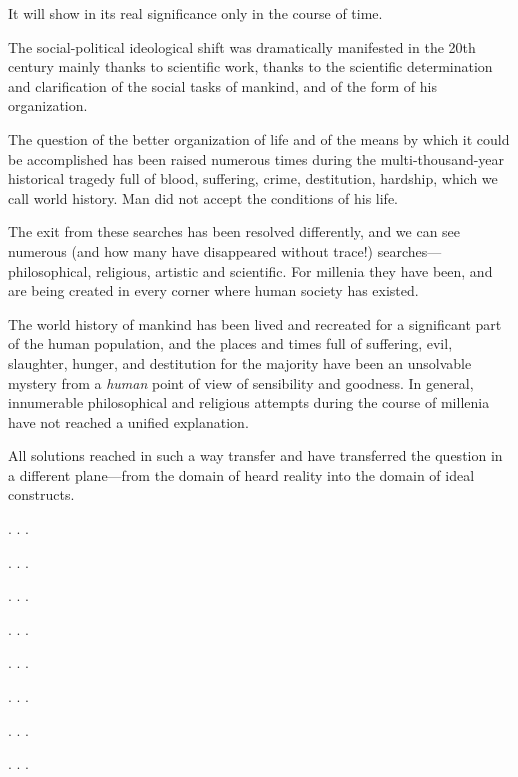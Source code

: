 It will show in its real significance only in the course of time.

The social-political ideological shift was dramatically manifested in the 20th
century mainly thanks to scientific work, thanks to the scientific
determination and clarification of the social tasks of mankind, and of the
form of his organization.


\Section %
The question of the better organization of life and of the means by which
it could be accomplished has been raised numerous times during the
multi-thousand-year historical tragedy full of blood, suffering, crime,
destitution, hardship, which we call world history.  Man did not accept the
conditions of his life.

The exit from these searches has been resolved differently, and we can see
numerous (and how many have disappeared without trace!)
searches---philosophical, religious, artistic and scientific.  For millenia
they have been, and are being created in every corner where human society has
existed.

The world history of mankind has been lived and recreated for a significant
part of the human population, and the places and times full of suffering,
evil, slaughter, hunger, and destitution for the majority have been an
unsolvable mystery from a \emph{human} point of view of sensibility and
goodness.  In general, innumerable philosophical and religious attempts during
the course of millenia have not reached a unified explanation.

All solutions reached in such a way transfer and have transferred the question
in a different plane---from the domain of heard reality into the domain of
ideal constructs.

. . .


\Section %

. . .

\Section %

. . .

\Section %

. . .

\Section %

. . .

\Section %

. . .

\Section %

. . .

\Section %

. . .

\Section %

